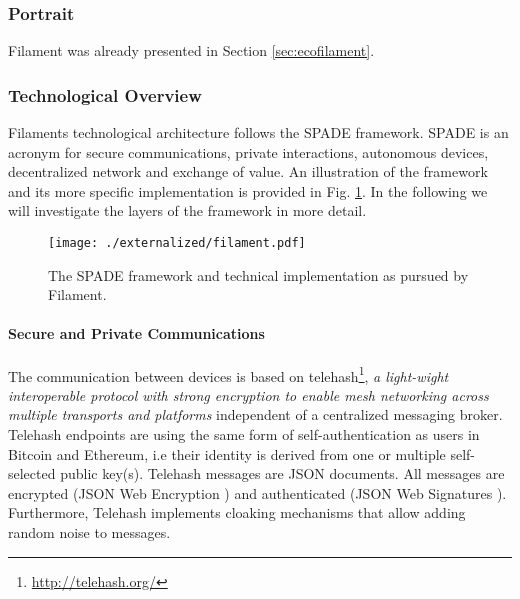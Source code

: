 \subsubsection{Portrait}

Filament was already presented in Section \ref{sec:ecofilament}. 

\subsubsection{Technological Overview}

Filaments technological architecture follows the SPADE framework. SPADE is an acronym for secure communications, private interactions, autonomous devices, decentralized network and exchange of value. An illustration of the framework and its more specific implementation is provided in Fig. \ref{fig:filament}. In the following we will investigate the layers of the framework in more detail. 

\begin{figure}
\centering
\texttt{[image: ./externalized/filament.pdf]}
\caption{The SPADE framework and technical implementation as pursued by Filament.}
\label{fig:filament}
\end{figure}


\paragraph{Secure and Private Communications}
The communication between devices is based on telehash\footnote{\url{http://telehash.org/}}, \emph{a light-wight interoperable protocol with strong encryption to enable mesh networking across multiple transports and platforms} independent of a centralized messaging broker.  Telehash endpoints are using the same form of self-authentication as users in Bitcoin and Ethereum, i.e their identity is derived from one or multiple self-selected public key(s). Telehash messages are JSON documents. All messages are encrypted (JSON Web Encryption \cite{rfc7516}) and authenticated (JSON Web Signatures \cite{rfc7515}). Furthermore, Telehash implements cloaking mechanisms that allow adding random noise to messages.

